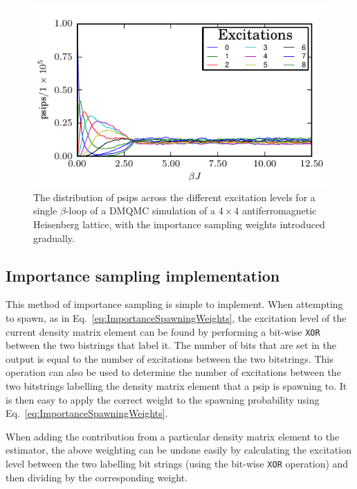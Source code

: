 \begin{figure}[H]
\begin{center}
\includegraphics[width =1\textwidth]{excitations_is.pdf}
\caption[The distribution of psips across the different excitation levels for a single $\beta$-loop of a DMQMC simulation of a $4\times4$ antiferromagnetic Heisenberg lattice, with the importance sampling weights introduced gradually.]{The distribution of psips across the different excitation levels for a single $\beta$-loop of a DMQMC simulation of a $4\times4$ antiferromagnetic Heisenberg lattice, with the importance sampling weights introduced gradually. }
\label{fig:excitations_is}
\end{center}
\end{figure}

\subsection{Importance sampling implementation}
This method of importance sampling is simple to implement. When attempting to spawn, as in Eq.~\ref{eq:ImportanceSpawningWeights}, the excitation level of the current density matrix element can be found by performing a bit-wise \texttt{XOR} between the two bistrings that label it. The number of bits that are set in the output is equal to the number of excitations between the two bitstrings. This operation can also be used to determine the number of excitations between the two bitstrings labelling the density matrix element that a psip is spawning to. It is then easy to apply the correct weight to the spawning probability using Eq.~\ref{eq:ImportanceSpawningWeights}.

When adding the contribution from a particular density matrix element to the estimator, the above weighting can be undone easily by calculating the excitation level between the two labelling bit strings (using the bit-wise \texttt{XOR} operation) and then dividing by the corresponding weight.

